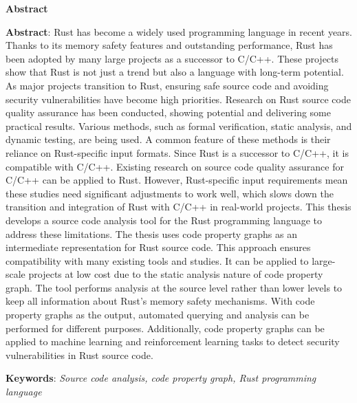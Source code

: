 \begin{center}
\textbf{\large{Abstract}}
\end{center}

\begin{small}

\textbf{Abstract}:
Rust has become a widely used programming language in recent years.
Thanks to its memory safety features and outstanding performance, Rust has been adopted by many large projects as a successor to C/C++.
These projects show that Rust is not just a trend but also a language with long-term potential.
As major projects transition to Rust, ensuring safe source code and avoiding security vulnerabilities have become high priorities.
Research on Rust source code quality assurance has been conducted, showing potential and delivering some practical results.
Various methods, such as formal verification, static analysis, and dynamic testing, are being used.
A common feature of these methods is their reliance on Rust-specific input formats.
Since Rust is a successor to C/C++, it is compatible with C/C++.
Existing research on source code quality assurance for C/C++ can be applied to Rust.
However, Rust-specific input requirements mean these studies need significant adjustments to work well, which slows down the transition and integration of Rust with C/C++ in real-world projects.
This thesis develops a source code analysis tool for the Rust programming language to address these limitations.
The thesis uses code property graphs as an intermediate representation for Rust source code.
This approach ensures compatibility with many existing tools and studies.
It can be applied to large-scale projects at low cost due to the static analysis nature of code property graph.
The tool performs analysis at the source level rather than lower levels to keep all information about Rust’s memory safety mechanisms.
With code property graphs as the output, automated querying and analysis can be performed for different purposes.
Additionally, code property graphs can be applied to machine learning and reinforcement learning tasks to detect security vulnerabilities in Rust source code.

\vspace*{1cm}
\textbf{Keywords}: \textit{Source code analysis, code property graph, Rust programming language}
\end{small}
